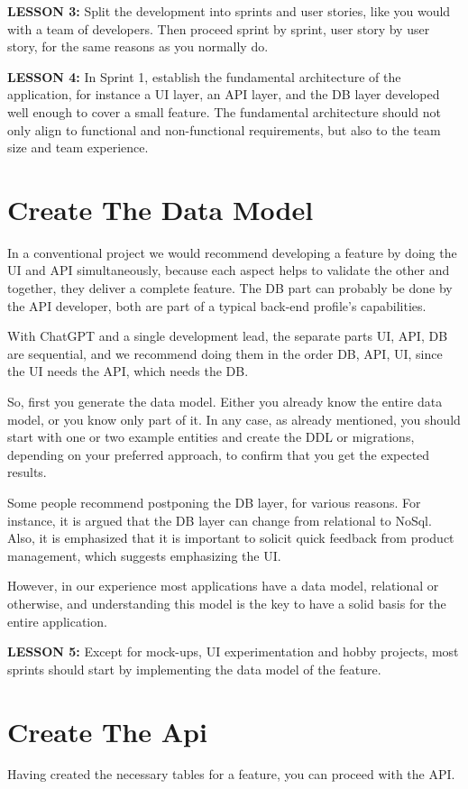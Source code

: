\documentclass[runningheads]{llncs}
\begin{document}
\textbf{LESSON 3:} Split the development into sprints and user stories, like you would with a team of developers. Then
proceed sprint by sprint, user story by user story, for the same reasons as you normally do.

\textbf{LESSON 4:} In Sprint 1, establish the fundamental architecture of the application, for instance a UI layer, an API layer, and the DB layer developed well enough to cover a small feature. The fundamental architecture should not only align to functional and non-functional requirements, but also to the team size and team experience.

\section{Create The Data Model}
In a conventional project we would recommend developing a feature by doing the UI and API simultaneously, because each aspect helps to validate the other and together, they deliver a complete feature. The DB part can probably be done by the API developer, both are part of a typical back-end profile's capabilities.

With ChatGPT and a single development lead, the separate parts UI, API, DB are sequential, and we recommend doing them in the order DB, API, UI, since the UI needs the API, which needs the DB.

So, first you generate the data model. Either you already know the entire data model, or you know only part of it. In any case, as already mentioned, you should start with one or two example entities and create the DDL or migrations, depending on your preferred approach, to confirm that you get the expected results.

Some people recommend postponing the DB layer, for various reasons. For instance, it is argued that the DB layer can change from relational to NoSql. Also, it is emphasized that it is important to solicit quick feedback from product management, which suggests emphasizing the UI.

However, in our experience most applications have a data model, relational or otherwise, and understanding this model is the key to have a solid basis for the entire application.

\textbf{LESSON 5:} Except for mock-ups, UI experimentation and hobby projects, most sprints should start by implementing the data model of the feature.

\section{Create The Api}
Having created the necessary tables for a feature, you can proceed with the API.
\end{document}
